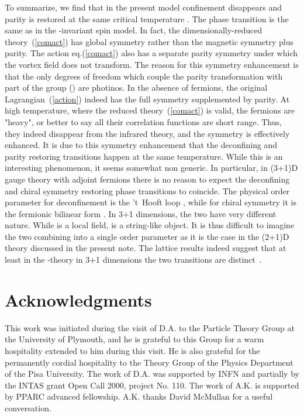 \documentclass[a4paper,12pt]{article}
\begin{document}
To summarize, we find that in the present model confinement
disappears and parity is restored at the same critical temperature
\coordHE{}. The phase transition is the same as in the
\coordHE{}-invariant spin model. In fact, the dimensionally-reduced
theory~(\ref{comact}) has \coordHE{} global symmetry rather than the
\coordHE{} magnetic symmetry plus parity. The action
eq.(\ref{comact}) also has a separate parity symmetry under which
the vortex field does not transform. The reason for this symmetry
enhancement is that the only degrees of freedom which couple the
parity transformation with part of the \coordHE{} group (\coordHE{}) are photinos. In the absence of fermions, the original
Lagrangian~(\ref{action}) indeed has the full \coordHE{} symmetry
supplemented by parity. At high temperature, where the reduced
theory~(\ref{comact}) is valid, the fermions are "heavy", or
better to say all their correlation functions are short range.
Thus, they indeed disappear from the infrared theory, and the
symmetry is effectively enhanced. It is due to this symmetry
enhancement that the deconfining and parity restoring transitions
happen at the same temperature. While this is an interesting
phenomenon, it seems somewhat non generic. In particular, in
(3+1)D gauge theory with adjoint fermions there is no reason to
expect the deconfining and chiral symmetry restoring phase
transitions to coincide. The physical order parameter for
deconfinement is the 't~Hooft loop \coordHE{} \cite{thooftloop}, while
for chiral symmetry it is the fermionic bilinear form
\myHighlight{$\bar\lambda\lambda$}\coordHE{}. In 3+1 dimensions, the two have very
different nature. While \myHighlight{$\bar\lambda\lambda$}\coordHE{} is a local field, \coordHE{}
is a string-like object. It is thus difficult to imagine the two
combining into a single order parameter as it is the case in the
(2+1)D theory discussed in the present note. The lattice results
indeed suggest that at least in the \coordHE{}-theory in 3+1
dimensions the two transitions are distinct~\cite{adjoint}.

\section*{Acknowledgments}
This work was initiated during the visit of D.A. to the
Particle Theory Group at the University of Plymouth, and he is grateful to this Group
for a warm hospitality extended to him during this visit. He is also grateful for the permanently cordial hospitality
to the Theory Group of the Physics Department of the Pisa University.
The work of D.A. was supported by INFN and partially by the
INTAS grant Open Call 2000, project No. 110.
The work of
A.K. is supported by PPARC advanced fellowship. A.K. thanks David
McMullan for a useful conversation.
\end{document}
